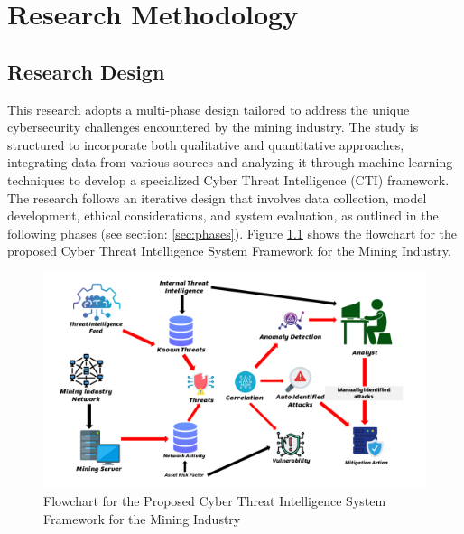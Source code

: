 \documentclass[a4paper,twoside,12pt]{report}
\begin{document}
\chapter{Research Methodology}

\section{Research Design}

This research adopts a multi-phase design tailored to address the unique cybersecurity challenges encountered by the mining industry. The study is structured to incorporate both qualitative and quantitative approaches, integrating data from various sources and analyzing it through machine learning techniques to develop a specialized Cyber Threat Intelligence (CTI) framework. The research follows an iterative design that involves data collection, model development, ethical considerations, and system evaluation, as outlined in the following phases (see section: \ref{sec:phases}). Figure \ref{fig:thing31} shows the flowchart for the proposed Cyber Threat Intelligence System Framework for the Mining Industry.
\begin{figure}[ht]
    \label{fig:thing31}
    \centering
    \includegraphics[width=1.0\linewidth]{images/cti-framwork-flowchart.png}  %
    \caption{Flowchart for the Proposed Cyber Threat Intelligence System Framework for the Mining Industry}
\end{figure}


\end{document}
